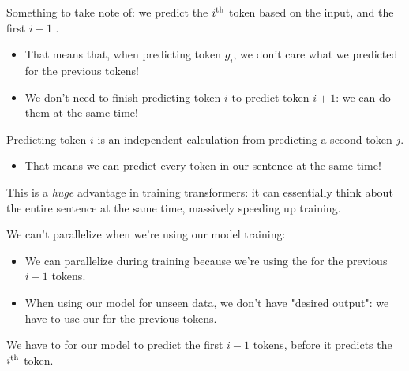         Something to take note of: we predict the $i^{ \text{th} }$ token based on the input, and the first $i-1$ .

        \begin{itemize}
            \item That means that, when predicting token $g_i$, we don't care what we predicted for the previous tokens!

            \item We don't need to finish predicting token $i$ to predict token $i+1$: we can do them at the same time!\\
        \end{itemize}

        \begin{concept}
        
            Predicting token $i$ is an independent calculation from predicting a second token $j$.

            \begin{itemize}
                \item That means we can predict every token in our sentence at the same time!
            \end{itemize}
        \end{concept}

        This is a \textit{huge} advantage in training transformers: it can essentially think about the entire sentence at the same time, massively speeding up training.\\

        \begin{clarification}
            We can't parallelize  when we're using our model  training:

            \begin{itemize}
                \item We can parallelize during training because we're using the  for the previous $i-1$ tokens.

                \item When using our model for unseen data, we don't have "desired output": we have to use our  for the previous tokens.
            \end{itemize}

            We have to  for our model to predict the first $i-1$ tokens, before it predicts the $i^{ \text{th} }$ token.

            
        \end{clarification}


